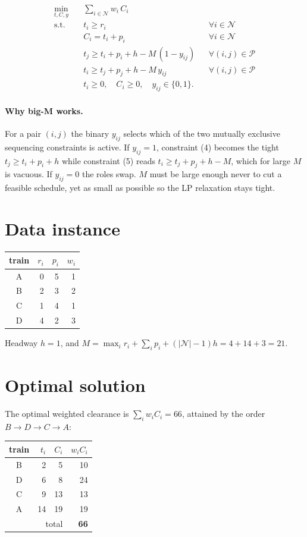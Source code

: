 \documentclass[11pt]{article}
\begin{document}
\begin{align}
\min_{t,C,y}\quad & \sum_{i\in\mathcal{N}} w_i\,C_i \\
\text{s.t.}\quad
& t_i \ge r_i && \forall i\in\mathcal{N} \\
& C_i = t_i + p_i && \forall i\in\mathcal{N} \\
& t_j \ge t_i + p_i + h - M\,(1 - y_{ij}) && \forall (i,j)\in\mathcal{P} \\
& t_i \ge t_j + p_j + h - M\,y_{ij} && \forall (i,j)\in\mathcal{P} \\
& t_i \ge 0,\quad C_i \ge 0,\quad y_{ij}\in\{0,1\}.
\end{align}

\paragraph{Why big-M works.} For a pair $(i,j)$ the binary $y_{ij}$ selects
which of the two mutually exclusive sequencing constraints is active. If
$y_{ij}=1$, constraint (4) becomes the tight $t_j \ge t_i + p_i + h$ while
constraint (5) reads $t_i \ge t_j + p_j + h - M$, which for large $M$ is
vacuous. If $y_{ij}=0$ the roles swap. $M$ must be large enough never to cut
a feasible schedule, yet as small as possible so the LP relaxation stays
tight.

\section*{Data instance}

\begin{center}
\begin{tabular}{c r r r}
\toprule
train & $r_i$ & $p_i$ & $w_i$ \\
\midrule
A & 0 & 5 & 1 \\
B & 2 & 3 & 2 \\
C & 1 & 4 & 1 \\
D & 4 & 2 & 3 \\
\bottomrule
\end{tabular}
\end{center}

\noindent Headway $h = 1$, and
$M = \max_i r_i + \sum_i p_i + (|\mathcal{N}|-1)h = 4 + 14 + 3 = 21$.

\section*{Optimal solution}

The optimal weighted clearance is $\sum_i w_i C_i = 66$, attained by the
order $B \to D \to C \to A$:

\begin{center}
\begin{tabular}{c r r r}
\toprule
train & $t_i$ & $C_i$ & $w_i C_i$ \\
\midrule
B & 2  & 5  & 10 \\
D & 6  & 8  & 24 \\
C & 9  & 13 & 13 \\
A & 14 & 19 & 19 \\
\midrule
\multicolumn{3}{r}{total} & \textbf{66} \\
\bottomrule
\end{tabular}
\end{center}
\end{document}
